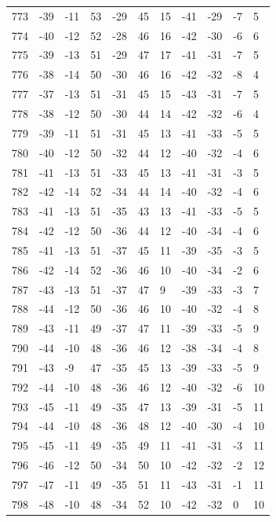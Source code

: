 \begin{table}[H]
\begin{tabular}{lllllllllll}
773 & -39 & -11 & 53 & -29 & 45 & 15 & -41 & -29 & -7 & 5 \\
774 & -40 & -12 & 52 & -28 & 46 & 16 & -42 & -30 & -6 & 6 \\
775 & -39 & -13 & 51 & -29 & 47 & 17 & -41 & -31 & -7 & 5 \\
776 & -38 & -14 & 50 & -30 & 46 & 16 & -42 & -32 & -8 & 4 \\
777 & -37 & -13 & 51 & -31 & 45 & 15 & -43 & -31 & -7 & 5 \\
778 & -38 & -12 & 50 & -30 & 44 & 14 & -42 & -32 & -6 & 4 \\
779 & -39 & -11 & 51 & -31 & 45 & 13 & -41 & -33 & -5 & 5 \\
780 & -40 & -12 & 50 & -32 & 44 & 12 & -40 & -32 & -4 & 6 \\
781 & -41 & -13 & 51 & -33 & 45 & 13 & -41 & -31 & -3 & 5 \\
782 & -42 & -14 & 52 & -34 & 44 & 14 & -40 & -32 & -4 & 6 \\
783 & -41 & -13 & 51 & -35 & 43 & 13 & -41 & -33 & -5 & 5 \\
784 & -42 & -12 & 50 & -36 & 44 & 12 & -40 & -34 & -4 & 6 \\
785 & -41 & -13 & 51 & -37 & 45 & 11 & -39 & -35 & -3 & 5 \\
786 & -42 & -14 & 52 & -36 & 46 & 10 & -40 & -34 & -2 & 6 \\
787 & -43 & -13 & 51 & -37 & 47 & 9 & -39 & -33 & -3 & 7 \\
788 & -44 & -12 & 50 & -36 & 46 & 10 & -40 & -32 & -4 & 8 \\
789 & -43 & -11 & 49 & -37 & 47 & 11 & -39 & -33 & -5 & 9 \\
790 & -44 & -10 & 48 & -36 & 46 & 12 & -38 & -34 & -4 & 8 \\
791 & -43 & -9 & 47 & -35 & 45 & 13 & -39 & -33 & -5 & 9 \\
792 & -44 & -10 & 48 & -36 & 46 & 12 & -40 & -32 & -6 & 10 \\
793 & -45 & -11 & 49 & -35 & 47 & 13 & -39 & -31 & -5 & 11 \\
794 & -44 & -10 & 48 & -36 & 48 & 12 & -40 & -30 & -4 & 10 \\
795 & -45 & -11 & 49 & -35 & 49 & 11 & -41 & -31 & -3 & 11 \\
796 & -46 & -12 & 50 & -34 & 50 & 10 & -42 & -32 & -2 & 12 \\
797 & -47 & -11 & 49 & -35 & 51 & 11 & -43 & -31 & -1 & 11 \\
798 & -48 & -10 & 48 & -34 & 52 & 10 & -42 & -32 & 0 & 10 \\

\end{tabular}
\end{table}
